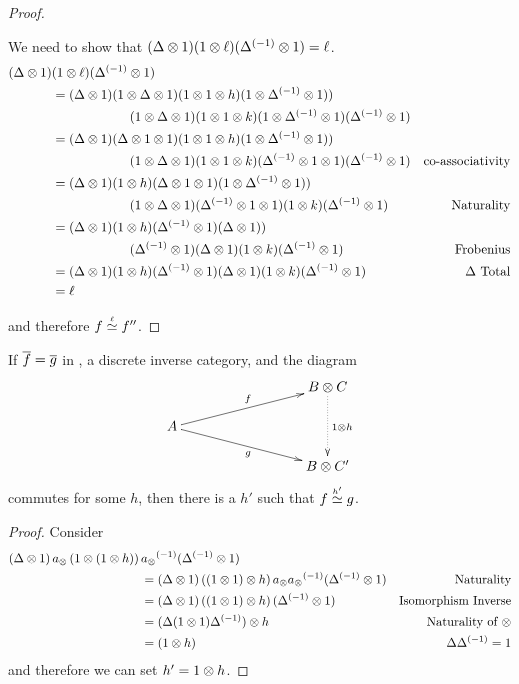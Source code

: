 \begin{proof}
\begin{description}
      We need to show that $(\Delta \otimes 1)(1 \otimes \ell)({\Delta}^{(-1)}\otimes1) = \ell$.
      \begin{align*} 
        (\Delta \otimes 1)&(1 \otimes \ell)({\Delta}^{(-1)}\otimes1) \\
        &=
          (\Delta \otimes 1)(1\otimes\Delta \otimes 1)  (1\otimes1 \otimes h ) (1\otimes{\Delta}^{(-1)}\otimes 1))\\
          &\qquad\qquad\qquad
            (1\otimes\Delta \otimes 1) (1\otimes 1 \otimes k) (1\otimes{\Delta}^{(-1)}\otimes 1)({\Delta}^{(-1)}\otimes 1)\\
        &=
          (\Delta \otimes 1)(\Delta \otimes 1\otimes1)  (1\otimes1 \otimes h ) (1\otimes{\Delta}^{(-1)}\otimes 1))\\
          & \qquad\qquad\qquad
            (1\otimes\Delta \otimes 1) (1\otimes 1 \otimes k) ({\Delta}^{(-1)}\otimes1\otimes 1)({\Delta}^{(-1)}\otimes 1)
              &\text{co-associativity}\\
        &=
          (\Delta \otimes 1)  (1 \otimes h ) (\Delta \otimes 1\otimes1)(1\otimes{\Delta}^{(-1)}\otimes 1)) \\
          &\qquad\qquad\qquad
            (1\otimes\Delta \otimes 1)  ({\Delta}^{(-1)}\otimes1\otimes 1)(1 \otimes k)({\Delta}^{(-1)}\otimes 1)&\text{Naturality}\\
        &=
          (\Delta \otimes 1)  (1 \otimes h ) ({\Delta}^{(-1)} \otimes1)(\Delta\otimes 1)) \\
          &\qquad\qquad\qquad
            ({\Delta}^{(-1)} \otimes 1)  (\Delta \otimes 1)(1 \otimes k)({\Delta}^{(-1)}\otimes 1)&\text{Frobenius}\\
        &=
          (\Delta \otimes 1)  (1 \otimes h ) ({\Delta}^{(-1)} \otimes1)
          (\Delta \otimes 1)(1 \otimes k)({\Delta}^{(-1)}\otimes 1)&\Delta\text{ Total}\\
        &= \ell
      \end{align*}
  \end{description}
  and therefore $f\overset{\scriptscriptstyle \ell}{\simeq}f''$.
\end{proof}

\begin{corollary}\label{cor:equivalence_simplified_diagram}
  If $\overline{f} = \overline{g}$ in \X, a discrete inverse category, and the diagram
  \[
    \xymatrix @C=40pt @R=15pt{
      & & B \* C \ar@{.>}[dd]^{1\*h}\\
      A \ar[urr]^f \ar[drr]_{g}\\
      && B\* C'
    }
  \]
  commutes for some $h$, then there is a $h'$ such that $f\overset{\scriptscriptstyle h'}{\simeq}g$.
\end{corollary}
\begin{proof}
  Consider
  \begin{align*}
    (\Delta \otimes1)\,a_{\otimes}\,(1\otimes(1\otimes h))\,&{a_{\otimes}}^{(-1)}({\Delta}^{(-1)}\otimes1)\\
    & = (\Delta \otimes1)\,((1\otimes1)\otimes h)\,a_{\otimes}{a_{\otimes}}^{(-1)}({\Delta}^{(-1)}\otimes1) & \text{Naturality}\\
    &=(\Delta \otimes1)\,((1\otimes1)\otimes h)\,({\Delta}^{(-1)}\otimes1) & \text{Isomorphism Inverse}\\
    &=(\Delta (1\otimes1) {\Delta}^{(-1)})\otimes h & \text{Naturality of }\otimes\\
    &=(1\otimes h) & \Delta  {\Delta}^{(-1)}=1\\
  \end{align*}
  and therefore we can set $h' = 1 \otimes h$.
\end{proof}




